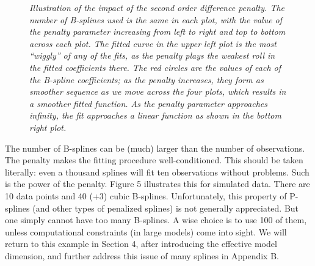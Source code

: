 \documentclass[12pt]{article}
\begin{document}
{\begin{figure}[H]
\begin{subfigure}{.5\textwidth}
  \label{fig:pspline_small_lambda}
\end{subfigure}
\caption{\textit{Illustration of the impact of the second order difference penalty. The number of B-splines used is the same in each plot, with the value of the penalty parameter increasing from left to right and top to bottom across each plot. The fitted curve in the upper left plot is the most ``wiggly'' of any of the fits, as the penalty plays the weakest roll in the fitted coefficients there. The red circles are the values of each of the B-spline coefficients; as the penalty increases, they form as smoother sequence as we move across the four plots, which results in a smoother fitted function. As the penalty parameter approaches infinity, the fit approaches a linear function as shown in the bottom right plot.}}
\label{fig:psplines_second_ord_pen_SML_lambda}
\end{figure}



  







The number of B-splines can be (much) larger than the number of observations. The penalty makes the fitting procedure well-conditioned. This should be taken literally: even a thousand splines will fit ten observations without problems. Such is the power of the penalty. Figure 5 illustrates this for simulated data. There are 10 data points and 40 (+3) cubic B-splines. Unfortunately, this property of P-splines (and other types of penalized splines) is not generally appreciated. But one simply cannot have too many B-splines. A wise choice is to use 100 of them, unless computational constraints (in large models) come into sight. We will return to this example in Section 4, after introducing the effective model dimension, and further address this issue of many splines in Appendix B.}
\end{document}
